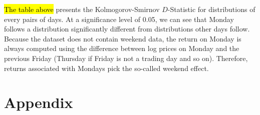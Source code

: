 \documentclass[12pt]{article}
\begin{document}
	\hl{The table above} presents the Kolmogorov-Smirnov $D$-Statistic for distributions of every pairs of days. At a significance level of 0.05, we can see that Monday follows a distribution significantly different from distributions other days follow. Because the dataset does not contain weekend data, the return on Monday is always computed using the difference between log prices on Monday and the previous Friday (Thursday if Friday is not a trading day and so on). Therefore, returns associated with Mondays pick the so-called weekend effect.


	
	
	

	\section{Appendix}
\end{document}
